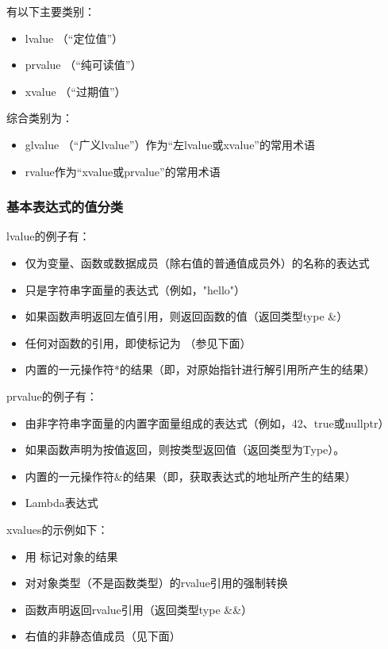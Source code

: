 有以下主要类别：

\begin{itemize}
	\item lvalue （“定位值”）
	\item prvalue （“纯可读值”）
	\item xvalue （“过期值”）
\end{itemize}

综合类别为：

\begin{itemize}
	\item glvalue （“广义lvalue”）作为“左lvalue或xvalue”的常用术语
	\item rvalue作为“xvalue或prvalue”的常用术语
\end{itemize}

\subsubsection{基本表达式的值分类}

lvalue的例子有：

\begin{itemize}
	\item 仅为变量、函数或数据成员（除右值的普通值成员外）的名称的表达式
	\item 只是字符串字面量的表达式（例如，"hello"）
	\item 如果函数声明返回左值引用，则返回函数的值（返回类型type \&）
	\item 任何对函数的引用，即使标记为 （参见下面）
	\item 内置的一元操作符*的结果（即，对原始指针进行解引用所产生的结果）
\end{itemize}

prvalue的例子有：

\begin{itemize}
	\item 由非字符串字面量的内置字面量组成的表达式（例如，42、true或nullptr）
	\item 如果函数声明为按值返回，则按类型返回值（返回类型为Type）。
	\item 内置的一元操作符\&的结果（即，获取表达式的地址所产生的结果）
	\item Lambda表达式
\end{itemize}

xvalues的示例如下：

\begin{itemize}
	\item 用  标记对象的结果
	\item 对对象类型（不是函数类型）的rvalue引用的强制转换
	\item 函数声明返回rvalue引用（返回类型type \&\&）
	\item 右值的非静态值成员（见下面）
\end{itemize}

